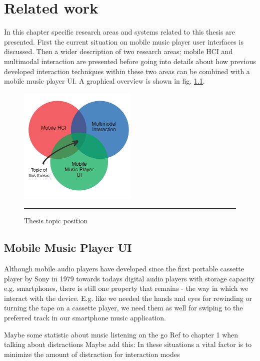 \chapter{Related work}
In this chapter specific research areas and systems related to this thesis are presented. First the current situation on mobile music player user interfaces is discussed. Then a wider description of two research areas; mobile HCI and multimodal interaction are presented before going into details about how previous developed interaction techniques within these two areas can be combined with a mobile music player UI. A graphical overview is shown in fig. \ref{fig:venn}.

\begin{figure}[htbp]
	\centering
		\includegraphics[width=0.5\textwidth,height=\textheight,keepaspectratio]{./Figures/venn.png}
		\rule{35em}{0.5pt}
	\caption[Venn diagram]{Thesis topic position}
	\label{fig:venn}
\end{figure}


\section{Mobile Music Player UI}
Although mobile audio players have developed since the first portable cassette player by Sony in 1979 towards todays digital audio players with storage capacity e.g. smartphones, there is still one property that remains - the way in which we interact with the device. E.g. like we needed the hands and eyes for rewinding or turning the tape on a cassette player, we need them as well for swiping to the preferred track in our smartphone music application.

Maybe some statistic about music listening on the go
Ref to chapter 1 when talking about distractions
Maybe add this: In these situations a vital factor is to minimize the amount of distraction for interaction modes \cite{pascoe_using_2000}

